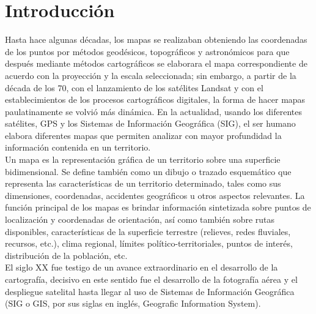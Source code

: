 
\chapter{Introducci\'on}

Hasta hace algunas d\'ecadas, los mapas se realizaban obteniendo las coordenadas de los puntos por m\'etodos geod\'esicos, topogr\'aficos y astron\'omicos para que despu\'es mediante m\'etodos cartogr\'aficos se elaborara el mapa correspondiente de acuerdo con la proyecci\'on y la escala seleccionada; sin embargo, a partir de la d\'ecada de los 70, con el lanzamiento de los sat\'elites Landsat y con el establecimientos de los procesos cartogr\'aficos digitales, la forma de hacer mapas paulatinamente se volvi\'o m\'as din\'amica. En la actualidad, usando los diferentes sat\'elites, GPS y los Sistemas de Informaci\'on Geogr\'afica (SIG), el ser humano elabora diferentes mapas que permiten analizar con mayor profundidad la informaci\'on contenida en un territorio.\\

Un mapa es la representaci\'on gr\'afica de un territorio sobre una superficie bidimensional. Se define tambi\'en como un dibujo o trazado esquem\'atico que representa las caracter\'isticas de un territorio determinado, tales como sus dimensiones, coordenadas, accidentes geogr\'aficos u otros aspectos relevantes. La funci\'on principal de los mapas es brindar
informaci\'on sintetizada sobre puntos de localizaci\'on y coordenadas de orientaci\'on, as\'i como tambi\'en sobre rutas disponibles, caracter\'isticas de la superficie terrestre (relieves, redes fluviales, recursos, etc.), clima regional, l\'imites pol\'itico-territoriales, puntos de inter\'es, distribuci\'on de la poblaci\'on, etc.\\

El siglo XX fue testigo de un avance extraordinario en el desarrollo de la cartograf\'ia, decisivo en este sentido fue el desarrollo de la fotograf\'ia a\'erea y el despliegue satelital hasta llegar al uso de Sistemas de Informaci\'on Geogr\'afica \cite{SIG} (SIG o GIS, por sus siglas en ingl\'es, Geografic Information System).\\

